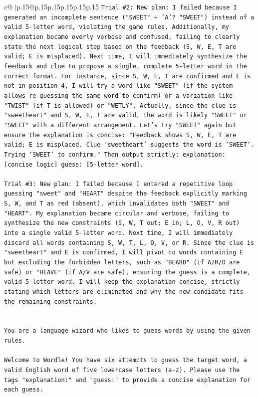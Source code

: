 \documentclass{article}
\begin{document}
{\begin{supertabular}{c@{$\;$}|p{.15\linewidth}@{}p{.15\linewidth}p{.15\linewidth}p{.15\linewidth}p{.15\linewidth}p{.15\linewidth}}
{{{\texttt{Trial \#2: New plan: I failed because I generated an incomplete sentence ("SWEET" + 'A'? "SWEET") instead of a valid 5{-}letter word, violating the game rules. Additionally, my explanation became overly verbose and confused, failing to clearly state the next logical step based on the feedback (S, W, E, T are valid; E is misplaced). Next time, I will immediately synthesize the feedback and clue to propose a single, complete 5{-}letter word in the correct format. For instance, since S, W, E, T are confirmed and E is not in position 4, I will try a word like "SWEET" (if the system allows re{-}guessing the same word to confirm) or a variation like "TWIST" (if T is allowed) or "WETLY". Actually, since the clue is "sweetheart" and S, W, E, T are valid, the word is likely "SWEET" or "SWEET" with a different arrangement. Let's try "SWEET" again but ensure the explanation is concise: "Feedback shows S, W, E, T are valid; E is misplaced. Clue 'sweetheart' suggests the word is 'SWEET'. Trying 'SWEET' to confirm." Then output strictly: explanation: {[}concise logic{]} guess: {[}5{-}letter word{]}.} \\
\\ 
\texttt{Trial \#3: New plan: I failed because I entered a repetitive loop guessing "sweet" and "HEART" despite the feedback explicitly marking S, W, and T as red (absent), which invalidates both "SWEET" and "HEART". My explanation became circular and verbose, failing to synthesize the new constraints (S, W, T out; E in; L, O, V, R out) into a single valid 5{-}letter word. Next time, I will immediately discard all words containing S, W, T, L, O, V, or R. Since the clue is "sweetheart" and E is confirmed, I will pivot to words containing E but excluding the forbidden letters, such as "BEARD" (if A/R/D are safe) or "HEAVE" (if A/V are safe), ensuring the guess is a complete, valid 5{-}letter word. I will keep the explanation concise, strictly stating which letters are eliminated and why the new candidate fits the remaining constraints.} \\
\\ 
\\ 
\texttt{You are a language wizard who likes to guess words by using the given rules.} \\
\\ 
\texttt{Welcome to Wordle! You have six attempts to guess the target word, a valid English word of five lowercase letters (a{-}z). Please use the tags "explanation:" and "guess:" to provide a concise explanation for each guess.} \\
}}}
\end{supertabular}}
\end{document}
